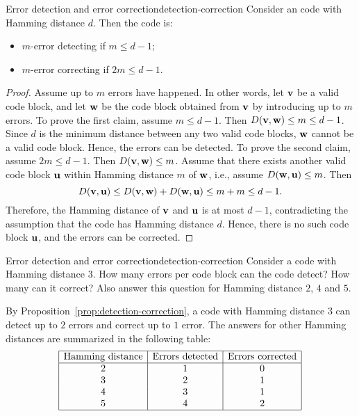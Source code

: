 \begin{proposition}{Error detection and error correction}{detection-correction}
  Consider an code with Hamming distance $d$. Then the code is:
  \begin{itemize}
  \item $m$-error detecting if $m\leq d-1$;
  \item $m$-error correcting if $2m\leq d-1$.
  \end{itemize}
\end{proposition}

\begin{proof}
  Assume up to $m$ errors have happened. In other words, let
  $\vect{v}$ be a valid code block, and let $\vect{w}$ be the code
  block obtained from $\vect{v}$ by introducing up to $m$ errors.  To
  prove the first claim, assume $m\leq d-1$.  Then
  $\Hd(\vect{v},\vect{w})\leq m\leq d-1$. Since $d$ is the minimum
  distance between any two valid code blocks, $\vect{w}$ cannot be a
  valid code block. Hence, the errors can be detected.  To prove the
  second claim, assume $2m\leq d-1$. Then
  $\Hd(\vect{v},\vect{w})\leq m$. Assume that there exists another
  valid code block $\vect{u}$ within Hamming distance $m$ of
  $\vect{w}$, i.e., assume $\Hd(\vect{w},\vect{u})\leq m$. Then
  \begin{equation*}
    \Hd(\vect{v},\vect{u}) \leq \Hd(\vect{v},\vect{w}) +
    \Hd(\vect{w},\vect{u}) \leq m+m \leq d-1.
  \end{equation*}
  Therefore, the Hamming distance of $\vect{v}$ and $\vect{u}$ is at
  most $d-1$, contradicting the assumption that the code has Hamming
  distance $d$. Hence, there is no such code block $\vect{u}$, and the
  errors can be corrected.
\end{proof}

\begin{example}{Error detection and error correction}{detection-correction}
  Consider a code with Hamming distance $3$. How many errors per code
  block can the code detect? How many can it correct? Also answer this
  question for Hamming distance $2$, $4$ and $5$.
\end{example}

\begin{solution}
  By Proposition~\ref{prop:detection-correction}, a code with Hamming
  distance $3$ can detect up to $2$ errors and correct up to $1$
  error. The answers for other Hamming distances are summarized in the
  following table:
  \begin{equation*}
    \begin{array}{|c|c|c|}
      \hline
      \mbox{Hamming distance} & \mbox{Errors detected} & \mbox{Errors corrected} \\\hline
      2 & 1 & 0 \\
      3 & 2 & 1 \\
      4 & 3 & 1 \\
      5 & 4 & 2 \\
      \hline
    \end{array}
  \end{equation*}
\end{solution}

